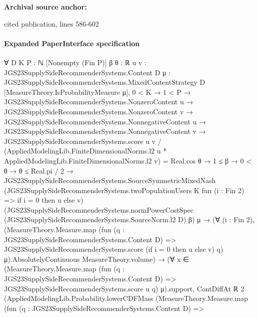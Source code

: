 \documentclass[10pt]{article}
\begin{document}
\textbf{Archival source anchor:} {\footnotesize\raggedright cited publication, lines 586-\allowbreak{}602\par}
\paragraph{Expanded PaperInterface specification}
\begin{ReviewVerbatim}
∀ {D K P : ℕ} [Nonempty (Fin P)] {β θ : ℝ} {u v : JGS23SupplySideRecommenderSystems.Content D}
  {μ : JGS23SupplySideRecommenderSystems.MixedContentStrategy D} [MeasureTheory.IsProbabilityMeasure μ],
  0 < K →
    1 < P →
      JGS23SupplySideRecommenderSystems.NonzeroContent u →
        JGS23SupplySideRecommenderSystems.NonzeroContent v →
          JGS23SupplySideRecommenderSystems.NonnegativeContent u →
            JGS23SupplySideRecommenderSystems.NonnegativeContent v →
              JGS23SupplySideRecommenderSystems.score u v /
                    (AppliedModelingLib.FiniteDimensionalNorms.l2 u * AppliedModelingLib.FiniteDimensionalNorms.l2 v) =
                  Real.cos θ →
                1 ≤ β →
                  0 < θ →
                    θ ≤ Real.pi / 2 →
                      JGS23SupplySideRecommenderSystems.SourceSymmetricMixedNash
                          (JGS23SupplySideRecommenderSystems.twoPopulationUsers K fun (i : Fin 2) =>
                            if i = 0 then u else v)
                          (JGS23SupplySideRecommenderSystems.normPowerCostSpec
                            (JGS23SupplySideRecommenderSystems.SourceNorm.l2 D) β)
                          μ →
                        (∀ (i : Fin 2),
                            (MeasureTheory.Measure.map
                                  (fun (q : JGS23SupplySideRecommenderSystems.Content D) =>
                                    JGS23SupplySideRecommenderSystems.score (if i = 0 then u else v) q)
                                  μ).AbsolutelyContinuous
                              MeasureTheory.volume) →
                          (∀
                              x ∈
                                (MeasureTheory.Measure.map
                                    (fun (q : JGS23SupplySideRecommenderSystems.Content D) =>
                                      JGS23SupplySideRecommenderSystems.score u q)
                                    μ).support,
                              ContDiffAt ℝ 2
                                (AppliedModelingLib.Probability.lowerCDFMass
                                  (MeasureTheory.Measure.map
                                    (fun (q : JGS23SupplySideRecommenderSystems.Content D) =>

\end{ReviewVerbatim}
\end{document}
